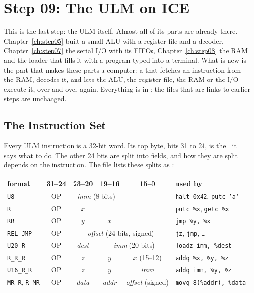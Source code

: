 \chapter{Step 09: The ULM on ICE}
\label{ch:step09}

\newcommand{\reg}[1]{\texttt{\%#1}}

This is the last step: the ULM itself. Almost all of its parts are already
there. Chapter~\ref{ch:step05} built a small ALU with a register file and a
decoder, Chapter~\ref{ch:step07} the serial I/O with its FIFOs,
Chapter~\ref{ch:step08} the RAM and the loader that fills it with a program
typed into a terminal. What is new is the part that makes these parts a
computer: a  that fetches an instruction from the RAM,
decodes it, and lets the ALU, the register file, the RAM or the I/O execute
it, over and over again. Everything is in ; the files that
are links to earlier steps are unchanged.

\section{The Instruction Set}
\label{sec:step09-isa}

Every ULM instruction is a 32-bit word. Its top byte, bits 31 to 24, is the
; it says what to do. The other 24 bits are split into fields,
and how they are split depends on the instruction. The file
 lists these splits as :

\begin{center}
\small
\begin{tabular}{lcccc@{\quad}l}
\toprule
format & 31--24 & 23--20 & 19--16 & 15--0 & used by \\
\midrule
\texttt{U8}      & OP & \multicolumn{2}{c}{\textit{imm} (8 bits)} & & \texttt{halt 0x42}, \texttt{putc 'a'} \\
\texttt{R}       & OP & $x$ & & & \texttt{putc \%x}, \texttt{getc \%x} \\
\texttt{RR}      & OP & $y$ & $x$ & & \texttt{jmp \%y, \%x} \\
\texttt{REL\_JMP} & OP & \multicolumn{3}{c}{\textit{offset} (24 bits, signed)} & \texttt{jz}, \texttt{jmp}, \dots \\
\texttt{U20\_R}  & OP & \textit{dest} & \multicolumn{2}{c}{\textit{imm} (20 bits)} & \texttt{loadz imm, \%dest} \\
\texttt{R\_R\_R} & OP & $z$ & $y$ & $x$ (15--12) & \texttt{addq \%x, \%y, \%z} \\
\texttt{U16\_R\_R} & OP & $z$ & $y$ & \textit{imm} & \texttt{addq imm, \%y, \%z} \\
\texttt{MR\_R}, \texttt{R\_MR} & OP & \textit{data} & \textit{addr} & \textit{offset} (signed) & \texttt{movq 8(\%addr), \%data} \\
\bottomrule
\end{tabular}
\end{center}

